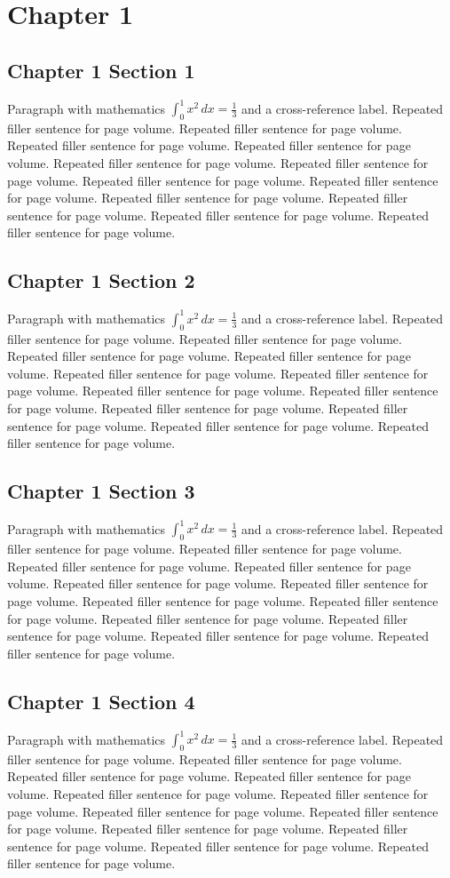 \documentclass[11pt]{report}
\begin{document}
\tableofcontents
\chapter{Chapter 1}
\section{Chapter 1 Section 1}
Paragraph with mathematics $\int_0^1 x^2\,dx = \frac13$ and a cross-reference label.
\label{sec:1:1}
Repeated filler sentence for page volume. Repeated filler sentence for page volume. Repeated filler sentence for page volume. Repeated filler sentence for page volume. Repeated filler sentence for page volume. Repeated filler sentence for page volume. Repeated filler sentence for page volume. Repeated filler sentence for page volume. Repeated filler sentence for page volume. Repeated filler sentence for page volume. Repeated filler sentence for page volume. Repeated filler sentence for page volume. 
\section{Chapter 1 Section 2}
Paragraph with mathematics $\int_0^1 x^2\,dx = \frac13$ and a cross-reference label.
\label{sec:1:2}
Repeated filler sentence for page volume. Repeated filler sentence for page volume. Repeated filler sentence for page volume. Repeated filler sentence for page volume. Repeated filler sentence for page volume. Repeated filler sentence for page volume. Repeated filler sentence for page volume. Repeated filler sentence for page volume. Repeated filler sentence for page volume. Repeated filler sentence for page volume. Repeated filler sentence for page volume. Repeated filler sentence for page volume. 
\section{Chapter 1 Section 3}
Paragraph with mathematics $\int_0^1 x^2\,dx = \frac13$ and a cross-reference label.
\label{sec:1:3}
Repeated filler sentence for page volume. Repeated filler sentence for page volume. Repeated filler sentence for page volume. Repeated filler sentence for page volume. Repeated filler sentence for page volume. Repeated filler sentence for page volume. Repeated filler sentence for page volume. Repeated filler sentence for page volume. Repeated filler sentence for page volume. Repeated filler sentence for page volume. Repeated filler sentence for page volume. Repeated filler sentence for page volume. 
\section{Chapter 1 Section 4}
Paragraph with mathematics $\int_0^1 x^2\,dx = \frac13$ and a cross-reference label.
\label{sec:1:4}
Repeated filler sentence for page volume. Repeated filler sentence for page volume. Repeated filler sentence for page volume. Repeated filler sentence for page volume. Repeated filler sentence for page volume. Repeated filler sentence for page volume. Repeated filler sentence for page volume. Repeated filler sentence for page volume. Repeated filler sentence for page volume. Repeated filler sentence for page volume. Repeated filler sentence for page volume. Repeated filler sentence for page volume. 
\end{document}
